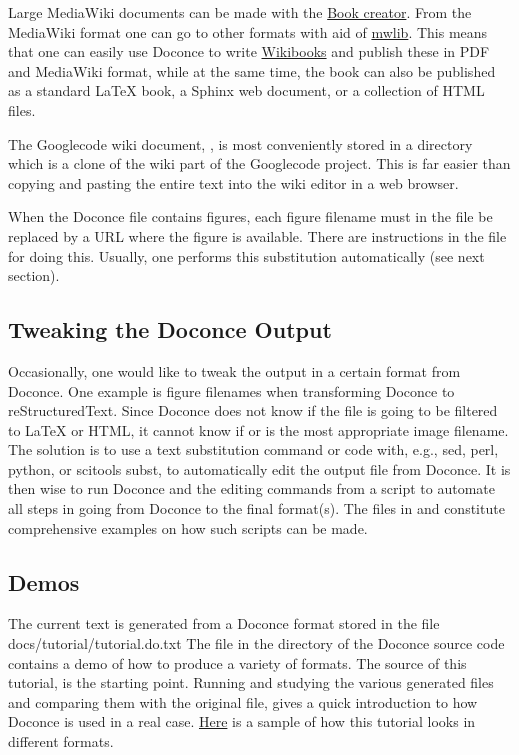 \documentclass[%
oneside,                 %
final,                   %
10pt]{article}
\begin{document}
Large MediaWiki documents can be made with the
\href{{http://en.wikipedia.org/w/index.php?title=Special:Book&bookcmd=book_creator}}{Book creator}.
From the MediaWiki format one can go to other formats with aid
of \href{{http://pediapress.com/code/}}{mwlib}. This means that one can
easily use Doconce to write \href{{http://en.wikibooks.org}}{Wikibooks}
and publish these in PDF and MediaWiki format, while
at the same time, the book can also be published as a
standard {\LaTeX} book, a Sphinx web document, or a collection of HTML files.



The Googlecode wiki document, , is most conveniently stored
in a directory which is a clone of the wiki part of the Googlecode project.
This is far easier than copying and pasting the entire text into the
wiki editor in a web browser.

When the Doconce file contains figures, each figure filename must in
the  file be replaced by a URL where the figure is
available. There are instructions in the file for doing this. Usually,
one performs this substitution automatically (see next section).

\subsection{Tweaking the Doconce Output}

Occasionally, one would like to tweak the output in a certain format
from Doconce. One example is figure filenames when transforming
Doconce to reStructuredText. Since Doconce does not know if the
 file is going to be filtered to {\LaTeX} or HTML, it cannot know
if  or  is the most appropriate image filename.
The solution is to use a text substitution command or code with, e.g., sed,
perl, python, or scitools subst, to automatically edit the output file
from Doconce. It is then wise to run Doconce and the editing commands
from a script to automate all steps in going from Doconce to the final
format(s). The  files in  and 
constitute comprehensive examples on how such scripts can be made.


\subsection{Demos}

The current text is generated from a Doconce format stored in the file
\bccq
docs/tutorial/tutorial.do.txt
\eccq
The file  in the  directory of the
Doconce source code contains a demo of how to produce a variety of
formats.  The source of this tutorial,  is the
starting point.  Running  and studying the various generated
files and comparing them with the original  file,
gives a quick introduction to how Doconce is used in a real case.
\href{{https://doconce.googlecode.com/hg/doc/demos/tutorial/index.html}}{Here}
is a sample of how this tutorial looks in different formats.
\end{document}
